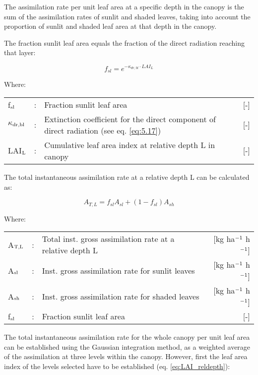 The assimilation rate per unit leaf area at a specific depth in the canopy is the sum of the
assimilation rates of sunlit and shaded leaves, taking into account the proportion of sunlit
and shaded leaf area at that depth in the canopy. 

The fraction sunlit leaf area equals the fraction of the direct radiation reaching that layer:

\begin{equation}
f_{sl} =  e^{-\kappa_{dr,bl} \cdot LAI_{L}}
\end{equation}

Where:\\[5pt]
\begin{tabularx}{\textwidth}{llXr}
	f$_{{\rm sl}}$ &:& Fraction sunlit leaf area   &     [-]\\
	$\kappa$$_{{\rm dr,bl}}$ &:& Extinction coefficient for the direct component of
	direct radiation (see eq. \ref{eq:5.17})   &     [-]\\
	LAI$_{{\rm L}}$ &:& Cumulative leaf area index at relative depth L in canopy  &      [-]
\end{tabularx}

The total instantaneous assimilation rate at a relative depth L can be calculated as:

\begin{equation}
\label{eq:5.28}
A_{T,L} = f_{sl} A_{sl} + (1 - f_{sl}) A_{sh} 
\end{equation}

Where:\\[5pt]
\begin{tabularx}{\textwidth}{llXr}
	A$_{{\rm T,L}}$ &:& Total inst. gross assimilation rate at a relative depth L   &
	[kg ha$^{{\rm -1}}$ h$^{{\rm -1}}$]\\
	A$_{{\rm sl}}$ &:& Inst. gross assimilation rate for sunlit leaves  & 
	[kg ha$^{{\rm -1}}$ h$^{{\rm -1}}$]\\
	A$_{{\rm sh}}$ &:& Inst. gross assimilation rate for shaded leaves  & 
	[kg ha$^{{\rm -1}}$ h$^{{\rm -1}}$]\\
	f$_{{\rm sl}}$ &:& Fraction sunlit leaf area  &  [-]\\
\end{tabularx}

The total instantaneous assimilation rate for the whole canopy per unit leaf area can be
established using the Gaussian integration method, as a weighted average of the assimilation 
at three levels within the canopy.
However, first the leaf area index of the levels selected have to be established (eq. \ref{eq:LAI_reldepth}):

